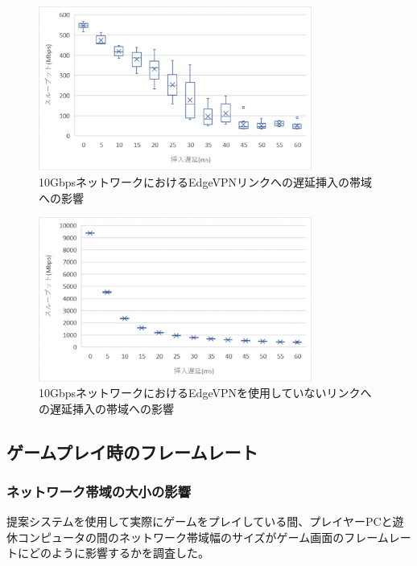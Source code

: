 
\begin{figure}[h!]
    \centering
    \includegraphics[width=0.8\textwidth,keepaspectratio,clip]{img/band_withedge_vm.eps}
    \caption{10GbpsネットワークにおけるEdgeVPNリンクへの遅延挿入の帯域への影響}
    \label{fig:band_withedge_vm}
\end{figure}

\begin{figure}[h!]
    \centering
    \includegraphics[width=0.8\textwidth,keepaspectratio,clip]{img/band_withoutedge_vm.eps}
    \caption{10GbpsネットワークにおけるEdgeVPNを使用していないリンクへの遅延挿入の帯域への影響}
    \label{fig:band_withoutedge_vm}
\end{figure}

\subsection{ゲームプレイ時のフレームレート}

\subsubsection{ネットワーク帯域の大小の影響}
提案システムを使用して実際にゲームをプレイしている間、プレイヤーPCと遊休コンピュータの間のネットワーク帯域幅のサイズがゲーム画面のフレームレートにどのように影響するかを調査した。

